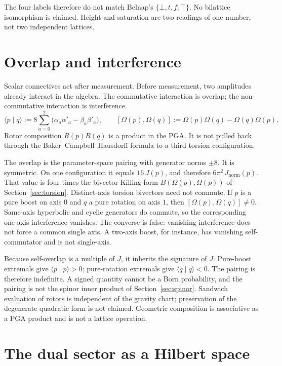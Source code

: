 \documentclass[a4paper]{article}
\theoremstyle{definition}
\newcommand{\Jnorm}{J_{\mathrm{norm}}}
\begin{document}
The four labels therefore do not match Belnap's
\(\{\bot,t,f,\top\}\). No bilattice isomorphism is claimed. Height and
saturation are two readings of one number, not two independent
lattices.

\section{Overlap and interference}
\label{sec:geo}

Scalar connectives act after measurement. Before measurement, two
amplitudes already interact in the algebra. The commutative interaction
is overlap; the non-commutative interaction is interference.
\[
\langle p\mid q\rangle := 8\sum_{a=0}^{2}\bigl(\alpha_a\alpha'_a-\beta_a\beta'_a\bigr),
\qquad
[\Omega(p),\Omega(q)] := \Omega(p)\Omega(q)-\Omega(q)\Omega(p).
\]
Rotor composition \(R(p)R(q)\) is a product in the PGA. It is not
pulled back through the Baker--Campbell--Hausdorff formula to a third
torsion configuration.

The overlap is the parameter-space pairing with generator norms
\(\pm 8\). It is symmetric. On one configuration it equals
\(16\,J(p)\), and therefore \(6\pi^2\,\Jnorm(p)\). That value is four
times the bivector Killing form \(B(\Omega(p),\Omega(p))\) of
Section~\ref{sec:torsion}. Distinct-axis torsion bivectors
need not commute. If \(p\) is a pure boost on axis \(0\) and \(q\) a
pure rotation on axis \(1\), then \([\Omega(p),\Omega(q)]\ne 0\).
Same-axis hyperbolic and cyclic generators do commute, so the
corresponding one-axis interference vanishes. The converse is false:
vanishing interference does not force a common single axis. A two-axis
boost, for instance, has vanishing self-commutator and is not
single-axis.

Because self-overlap is a multiple of \(J\), it inherits the signature
of \(J\). Pure-boost extremals give \(\langle p\mid p\rangle>0\);
pure-rotation extremals give \(\langle q\mid q\rangle<0\). The pairing
is therefore indefinite. A signed quantity cannot be a Born
probability, and the pairing is not the spinor inner product of
Section~\ref{sec:spinor}. Sandwich evaluation of rotors is independent
of the gravity chart; preservation of the degenerate quadratic form is
not claimed. Geometric composition is associative as a PGA product and
is not a lattice operation.

\section{The dual sector as a Hilbert space}
\label{sec:hilbert}
\end{document}
